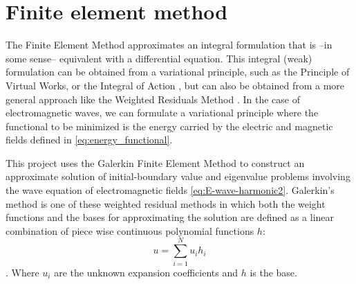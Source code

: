 \chapter{Finite element method}
\label{ch:Finite_element_method}

%
%
%
%
%
%
%
%

The Finite Element Method approximates an integral formulation that is --in some sense-- equivalent with a differential equation. This integral (weak) formulation can be obtained from a variational principle, such as the Principle of Virtual Works, or the Integral of Action \cite{Goldstein2001}, but can also be obtained from a more general approach like the Weighted Residuals Method \cite{Zienkiewicz2005, Reddy_functional_analysis}. In the case of electromagnetic waves, we can formulate a variational principle where the functional to be minimized is the energy carried by the electric and magnetic fields defined in \ref{eq:energy_functional}. 

This project uses the Galerkin Finite Element Method to construct an approximate solution of  initial-boundary value and eigenvalue problems involving the wave equation of electromagnetic fields \ref{eq:E-wave-harmonic2}. Galerkin's method is one of these weighted residual methods in which both the weight functions and the bases for approximating the solution are defined as a linear combination of piece wise continuous polynomial functions $h$: $$u = \sum_{i=1}^Nu_ih_i$$. Where $u_i$ are the unknown expansion coefficients and $h$ is the base. 

